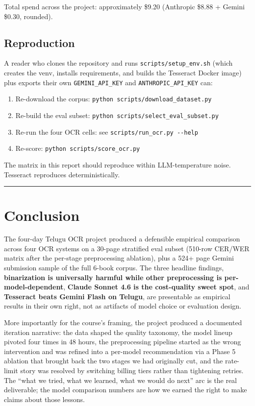 \documentclass[
  letterpaper,
  DIV=11,
  numbers=noendperiod]{scrartcl}
\providecommand{\tightlist}{%
  \setlength{\itemsep}{0pt}\setlength{\parskip}{0pt}}
\begin{document}
Total spend across the project: approximately \$9.20 (Anthropic \$8.88 +
Gemini \$0.30, rounded).

\subsection{Reproduction}\label{reproduction}

A reader who clones the repository and runs
\texttt{scripts/setup\_env.sh} (which creates the venv, installs
requirements, and builds the Tesseract Docker image) plus exports their
own \texttt{GEMINI\_API\_KEY} and \texttt{ANTHROPIC\_API\_KEY} can:

\begin{enumerate}
\def\labelenumi{\arabic{enumi}.}
\tightlist
\item
  Re-download the corpus: \texttt{python\ scripts/download\_dataset.py}
\item
  Re-build the eval subset:
  \texttt{python\ scripts/select\_eval\_subset.py}
\item
  Re-run the four OCR cells: see \texttt{scripts/run\_ocr.py\ -\/-help}
\item
  Re-score: \texttt{python\ scripts/score\_ocr.py}
\end{enumerate}

The matrix in this report should reproduce within LLM-temperature noise.
Tesseract reproduces deterministically.

\begin{center}\rule{0.5\linewidth}{0.5pt}\end{center}

\section{Conclusion}\label{conclusion}

The four-day Telugu OCR project produced a defensible empirical
comparison across four OCR systems on a 30-page stratified eval subset
(510-row CER/WER matrix after the per-stage preprocessing ablation),
plus a 524+ page Gemini submission sample of the full 6-book corpus. The
three headline findings, \textbf{binarization is universally harmful
while other preprocessing is per-model-dependent}, \textbf{Claude Sonnet
4.6 is the cost-quality sweet spot}, and \textbf{Tesseract beats Gemini
Flash on Telugu}, are presentable as empirical results in their own
right, not as artifacts of model choice or evaluation design.

More importantly for the course's framing, the project produced a
documented iteration narrative: the data shaped the quality taxonomy,
the model lineup pivoted four times in 48 hours, the preprocessing
pipeline started as the wrong intervention and was refined into a
per-model recommendation via a Phase 5 ablation that brought back the
two stages we had originally cut, and the rate-limit story was resolved
by switching billing tiers rather than tightening retries. The ``what we
tried, what we learned, what we would do next'' arc is the real
deliverable; the model comparison numbers are how we earned the right to
make claims about those lessons.
\end{document}

